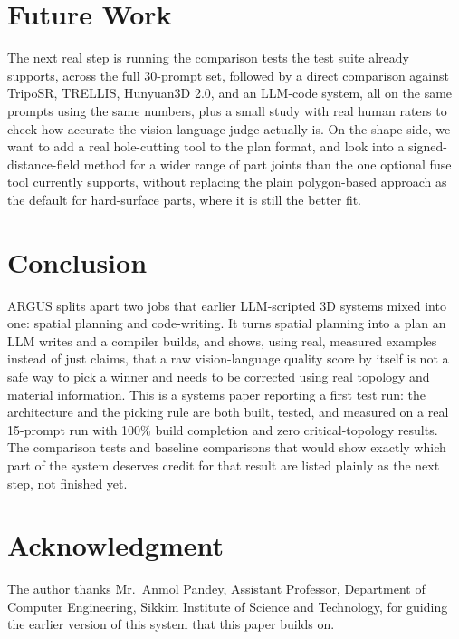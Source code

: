 \documentclass[conference]{IEEEtran}
\begin{document}
\section{Future Work}
The next real step is running the comparison tests the test suite already supports, across the full 30-prompt set, followed by a direct comparison against TripoSR, TRELLIS, Hunyuan3D 2.0, and an LLM-code system, all on the same prompts using the same numbers, plus a small study with real human raters to check how accurate the vision-language judge actually is. On the shape side, we want to add a real hole-cutting tool to the plan format, and look into a signed-distance-field method for a wider range of part joints than the one optional fuse tool currently supports, without replacing the plain polygon-based approach as the default for hard-surface parts, where it is still the better fit.

\section{Conclusion}
ARGUS splits apart two jobs that earlier LLM-scripted 3D systems mixed into one: spatial planning and code-writing. It turns spatial planning into a plan an LLM writes and a compiler builds, and shows, using real, measured examples instead of just claims, that a raw vision-language quality score by itself is not a safe way to pick a winner and needs to be corrected using real topology and material information. This is a systems paper reporting a first test run: the architecture and the picking rule are both built, tested, and measured on a real 15-prompt run with 100\% build completion and zero critical-topology results. The comparison tests and baseline comparisons that would show exactly which part of the system deserves credit for that result are listed plainly as the next step, not finished yet.

\section*{Acknowledgment}
The author thanks Mr.\ Anmol Pandey, Assistant Professor, Department of Computer Engineering, Sikkim Institute of Science and Technology, for guiding the earlier version of this system \cite{dahal2026thesis} that this paper builds on.



\end{document}
